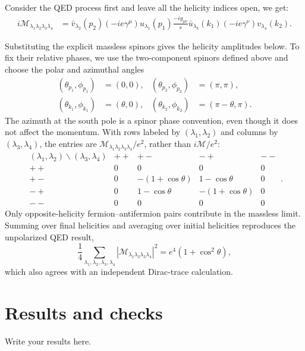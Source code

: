 \documentclass[a4paper,11pt]{article}
\newcommand{\nn}{\nonumber}
\begin{document}
Consider the QED process first and leave all the helicity indices open, we get:
\begin{align}
    i\mathcal{M}_{\lambda_1\lambda_2\lambda_3\lambda_4} &= \bar{v}_{\lambda_2}(p_2) (-ie\gamma^\mu) u_{\lambda_1}(p_1) \frac{-i g_{\mu\nu}}{s} \bar{u}_{\lambda_3}(k_1) (-ie\gamma^\nu) v_{\lambda_4}(k_2).
\end{align}

Substituting the explicit massless spinors gives the helicity amplitudes below.
To fix their relative phases, we use the two-component spinors defined above and choose the polar and azimuthal angles
\begin{align}
    (\theta_{p_1},\phi_{p_1}) &= (0,0), &
    (\theta_{p_2},\phi_{p_2}) &= (\pi,\pi), \nn\\
    (\theta_{k_1},\phi_{k_1}) &= (\theta,0), &
    (\theta_{k_2},\phi_{k_2}) &= (\pi-\theta,\pi).
\end{align}
The azimuth at the south pole is a spinor phase convention, even though it does not affect the momentum.
With rows labeled by $(\lambda_1,\lambda_2)$ and columns by $(\lambda_3,\lambda_4)$, the entries are $\mathcal{M}_{\lambda_1\lambda_2\lambda_3\lambda_4}/e^2$, rather than $i\mathcal{M}/e^2$:
\begin{equation}
\label{eq:qed-helicity-amplitudes}
    \begin{array}{c|cccc}
        (\lambda_1,\lambda_2)\backslash(\lambda_3,\lambda_4)
            & ++ & +- & -+ & -- \\ \hline
        ++  & 0 & 0 & 0 & 0 \\
        +-  & 0 & -(1+\cos\theta) & 1-\cos\theta & 0 \\
        -+  & 0 & 1-\cos\theta & -(1+\cos\theta) & 0 \\
        --  & 0 & 0 & 0 & 0
    \end{array}.
\end{equation}
Only opposite-helicity fermion--antifermion pairs contribute in the massless limit.
Summing over final helicities and averaging over initial helicities reproduces the unpolarized QED result,
\begin{equation}
\label{eq:qed-helicity-spin-sum}
    \frac{1}{4}\sum_{\lambda_1,\lambda_2,\lambda_3,\lambda_4}
    \left|\mathcal{M}_{\lambda_1\lambda_2\lambda_3\lambda_4}\right|^2
    = e^4\left(1+\cos^2\theta\right),
\end{equation}
which also agrees with an independent Dirac-trace calculation.

\section{Results and checks}
\label{sec:results}
Write your results here.
\end{document}
